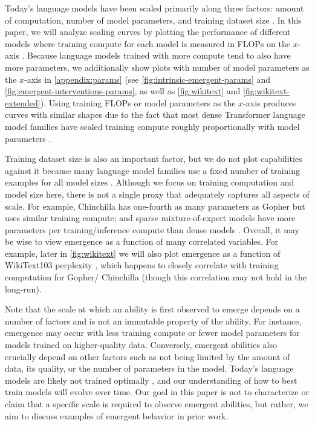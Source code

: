 Today's language models have been scaled primarily along three factors: amount of computation, number of model parameters, and training dataset size \citep{kaplan2020scaling,hoffmann2022training}. In this paper, we will analyze scaling curves by plotting the performance of different models where training compute for each model is measured in FLOPs on the $x$-axis \citep{hoffmann2022training}. Because language models trained with more compute tend to also have more parameters, we additionally show plots with number of model parameters as the $x$-axis in \ref{appendix:params} (see \ref{fig:intrinsic-emergent-params} and \ref{fig:emergent-interventions-params}, as well as \ref{fig:wikitext} and \ref{fig:wikitext-extended}).
Using training FLOPs or model parameters as the $x$-axis produces curves with similar shapes due to the fact that most dense Transformer language model families have scaled training compute roughly proportionally with model parameters \citep{kaplan2020scaling}.

Training dataset size is also an important factor, but we do not plot capabilities against it because many language model families use a fixed number of training examples for all model sizes \citep{brown2020language,rae2021scaling,chowdhery2022palm}. Although we focus on training computation and model size here, there is not a single proxy that adequately captures all aspects of scale. For example, Chinchilla \citep{hoffmann2022training} has one-fourth as many parameters as Gopher \citep{rae2021scaling} but uses similar training compute; and sparse mixture-of-expert models have more parameters per training/inference compute than dense models \citep{fedus2021switch,du2021glam}. Overall, it may be wise to view emergence as a function of many correlated variables. For example, later in \ref{fig:wikitext} we will also plot emergence as a function of WikiText103 perplexity \citep{merity2016pointer}, which happens to closely correlate with training computation for Gopher/ Chinchilla (though this correlation may not hold in the long-run).

Note that the scale at which an ability is first observed to emerge depends on a number of factors and is not an immutable property of the ability. For instance, emergence may occur with less training compute or fewer model parameters for models trained on higher-quality data. Conversely, emergent abilities also crucially depend on other factors such as not being limited by the amount of data, its quality, or the number of parameters in the model. Today's language models are likely not trained optimally \citep{hoffmann2022training}, and our understanding of how to best train models will evolve over time. Our goal in this paper is not to characterize or claim that a specific scale is required to observe emergent abilities, but rather, we aim to discuss examples of emergent behavior in prior work.

